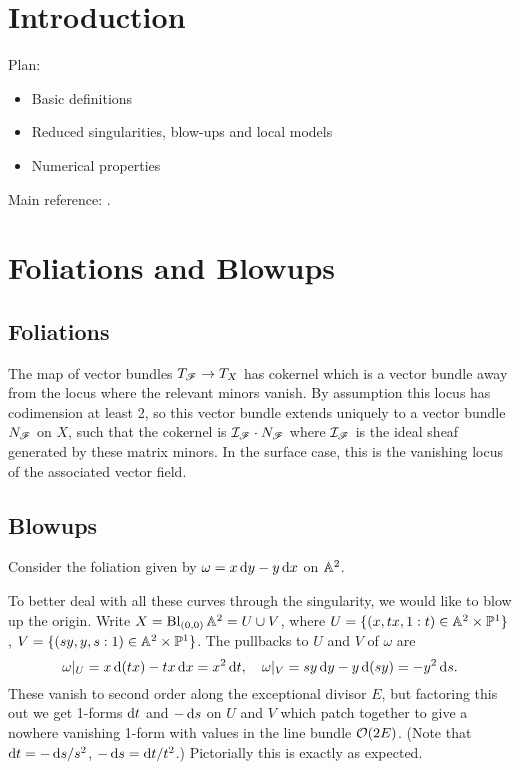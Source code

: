 
\section{Introduction}

Plan:
\begin{itemize}
    \item Basic definitions %
    \item Reduced singularities, blow-ups and local models
    \item Numerical properties %
\end{itemize}
Main reference: \cite{brunella_book}.

\section{Foliations and Blowups}

\subsection*{Foliations}

The map of vector bundles $T_{\mathscr{F}}\to T_X$ has cokernel which is a vector bundle
away from the locus where the relevant minors vanish. By assumption this locus
has codimension at least 2, so this vector bundle extends uniquely to a vector
bundle $N_{\mathscr{F}}$ on $X$, such that the cokernel is $\mathcal{I}_{\mathscr{F}}\cdot N_{\mathscr{F}}$
where $\mathcal{I}_{\mathscr{F}}$ is the ideal sheaf generated by these matrix minors. In the
surface case, this is the vanishing locus of the associated vector field.

\subsection*{Blowups}

\begin{example}
    Consider the foliation given by $\omega=x\d y-y\d x$ on $\mathbb{A}^2$. %

    To better deal with all these curves through the singularity, we would like
    to blow up the origin. Write $X=\operatorname{Bl}_{(0,0)}\mathbb{A}^2=U\cup V$, where
    $U=\{(x,tx,1:t)\in\mathbb{A}^2\times\mathbb{P}^1\}$, $V=\{(sy,y,s:1)\in\mathbb{A}^2\times\mathbb{P}^1\}$.
    The pullbacks to $U$ and $V$ of $\omega$ are
    \begin{equation*}
        \omega|_U = x\d(tx)-tx\d x = x^2\d t, \quad
        \omega|_V = sy\d y - y\d(sy) = -y^2\d s.
    \end{equation*}
    These vanish to second order along the exceptional divisor $E$, but
    factoring this out we get 1-forms $\d t$ and $-\d s$ on $U$ and $V$ which patch
    together to give a nowhere vanishing 1-form with values in the line bundle
    $\mathcal{O}(2E)$. (Note that $\d t=-\d s/s^2$, $-\d s=\d t/t^2$.) Pictorially this
    is exactly as expected. %
\end{example}


